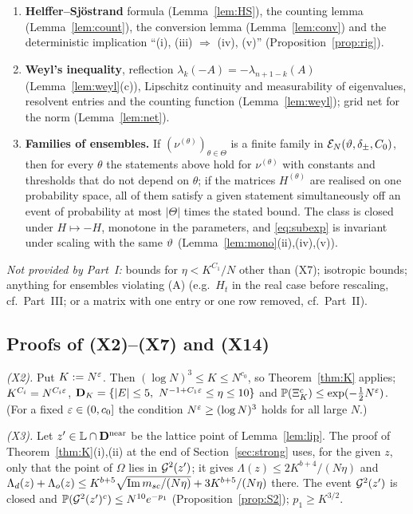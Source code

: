 \begin{enumerate}[label=\textbf{(X\arabic*)},leftmargin=3em,itemsep=3pt]
\item \textbf{Helffer--Sj\"ostrand} formula (Lemma~\ref{lem:HS}), the counting lemma (Lemma~\ref{lem:count}), the conversion lemma (Lemma~\ref{lem:conv}) and the deterministic implication ``(i), (iii) $\Rightarrow$ (iv), (v)'' (Proposition~\ref{prop:rig}).
\item \textbf{Weyl's inequality}, reflection $\lambda_k(-A)=-\lambda_{n+1-k}(A)$ (Lemma~\ref{lem:weyl}(c)), Lipschitz continuity and measurability of eigenvalues, resolvent entries and the counting function (Lemma~\ref{lem:weyl}); grid net for the norm (Lemma~\ref{lem:net}).
\item \textbf{Families of ensembles.} If $(\nu^{(\theta)})_{\theta\in\Theta}$ is a finite family in $\mathcal E_N(\vartheta,\delta_\pm,C_0)$, then for every $\theta$ the statements above hold for $\nu^{(\theta)}$ with constants and thresholds that do not depend on $\theta$;
if the matrices $H^{(\theta)}$ are realised on one probability space, all of them satisfy a given statement simultaneously off an event of probability at most $|\Theta|$ times the stated bound.
The class is closed under $H\mapsto-H$, monotone in the parameters, and \eqref{eq:subexp} is invariant under scaling with the same $\vartheta$ (Lemma~\ref{lem:mono}(ii),(iv),(v)).
\end{enumerate}
\noindent\emph{Not provided by Part~I:} bounds for $\eta<K^{C_1}/N$ other than (X7); isotropic bounds; anything for ensembles violating (A) (e.g.\ $H_t$ in the real case before rescaling, cf.\ Part~III; or a matrix with one entry or one row removed, cf.\ Part~II).

\subsection{Proofs of \textup{(X2)--(X7)} and \textup{(X14)}}\label{sec:exportproofs}
\emph{\textup{(X2)}.} Put $K:=N^\varepsilon$. Then $(\log N)^3\le K\le N^{c_0}$, so Theorem~\ref{thm:K} applies; $K^{C_i}=N^{C_i\varepsilon}$, $\bD_K=\{|E|\le5,\ N^{-1+C_1\eps}\le\eta\le10\}$ and $\mathbb{P}(\Xi_K^c)\le\exp(-\frac12N^\varepsilon)$. (For a fixed $\varepsilon\in(0,c_0]$ the condition $N^\varepsilon\ge(\log N)^3$ holds for all large $N$.)

\emph{\textup{(X3)}.} Let $z'\in\mathbb L\cap\mathbf{D}^{\rm near}$ be the lattice point of Lemma~\ref{lem:lip}. The proof of Theorem~\ref{thm:K}(i),(ii) at the end of Section~\ref{sec:strong} uses, for the given $z$, only that the point of $\Omega$ lies in $\mathcal{G}^2(z')$;
it gives $\Lambda(z)\le2K^{b+4}/(N\eta)$ and $\Lambda_d(z)+\Lambda_o(z)\le K^{b+5}\sqrt{\operatorname{Im}m_{sc}/(N\eta)}+3K^{b+5}/(N\eta)$ there. The event $\mathcal{G}^2(z')$ is closed and $\mathbb{P}(\mathcal{G}^2(z')^c)\le N^{10}e^{-p_1}$ (Proposition~\ref{prop:S2}); $p_1\ge K^{3/2}$.

